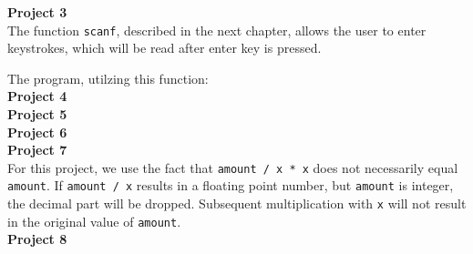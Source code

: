 \documentclass[a4paper, 10pt]{article}
\begin{document}
\textbf{Project 3} \\
The function \texttt{scanf}, described in the next chapter, allows the user to enter keystrokes, which will be read after enter key is pressed.

The program, utilzing this function:\\

 

\textbf{Project 4} \\



\textbf{Project 5} \\


 
\textbf{Project 6} \\


 
\textbf{Project 7} \\

For this project, we use the fact that \texttt{amount / x * x} does not necessarily equal \texttt{amount}. If \texttt{amount / x} results in a floating point number, but \texttt{amount} is integer, the decimal part will be dropped. Subsequent multiplication with \texttt{x} will not result in the original value of \texttt{amount}. \\



\textbf{Project 8} \\


\end{document}
